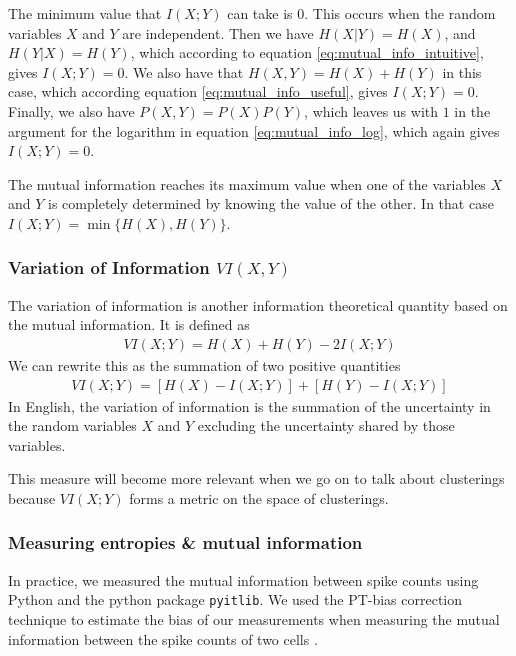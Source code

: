         The minimum value that $I(X;Y)$ can take is $0$. This occurs when the random variables $X$ and $Y$ are independent. Then we have $H(X|Y) = H(X)$, and $H(Y|X) = H(Y)$, which according to equation \ref{eq:mutual_info_intuitive}, gives $I(X;Y) = 0$. We also have that $H(X,Y) = H(X) + H(Y)$ in this case, which according equation \ref{eq:mutual_info_useful}, gives $I(X;Y) = 0$. Finally, we also have $P(X,Y) = P(X)P(Y)$, which leaves us with $1$ in the argument for the logarithm in equation \ref{eq:mutual_info_log}, which again gives $I(X;Y) = 0$.

        The mutual information reaches its maximum value when one of the variables $X$ and $Y$ is completely determined by knowing the value of the other. In that case $I(X;Y) = \min \lbrace H(X), H(Y) \rbrace$.

        \subsubsection{Variation of Information $VI(X,Y)$}\label{sec:variation_of_information}
        The variation of information is another information theoretical quantity based on the mutual information. It is defined as
        \begin{align}\label{eq:variation_of_information}
            VI(X;Y) = H(X) + H(Y) - 2 I(X;Y)
        \end{align}
        We can rewrite this as the summation of two positive quantities
        \begin{align}
            VI(X;Y) = \left[ H(X) - I(X;Y) \right] + \left[ H(Y) - I(X;Y) \right]
        \end{align}
        In English, the variation of information is the summation of the uncertainty in the random variables $X$ and $Y$ excluding the uncertainty shared by those variables.

        This measure will become more relevant when we go on to talk about clusterings because $VI(X;Y)$ forms a metric on the space of clusterings.

        \subsubsection{Measuring entropies \& mutual information}
        In practice, we measured the mutual information between spike counts using Python and the python package \texttt{pyitlib}. We used the PT-bias correction technique to estimate the bias of our measurements when measuring the mutual information between the spike counts of two cells  \parencite{treves}.

